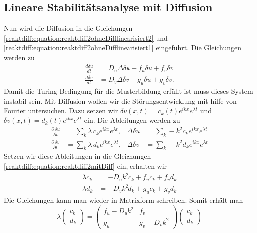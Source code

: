 \subsection{Lineare Stabilitätsanalyse mit Diffusion
\label{reaktdiff:section:matheDiff}}
Nun wird die Diffusion in die Gleichungen \ref{reaktdiff:equation:reaktdiff2ohneDifflinearisiert2} und \ref{reaktdiff:equation:reaktdiff2ohneDifflinearisiert1} eingeführt.
Die Gleichungen werden zu
\begin{align}
    \label{reaktdiff:equation:reaktdiff2mitDiff}
    \frac{d \delta u}{dt} &= D_u \Delta \delta u + 
    f_u \delta u + f_v \delta v\\
    \frac{d \delta v}{dt} &= D_v \Delta \delta v + 
    g_u \delta u + g_v \delta v.
\end{align}
Damit die Turing-Bedingung für die Musterbildung erfüllt ist muss dieses System instabil sein.
Mit Diffusion wollen wir die Störungsentwicklung mit hilfe von Fourier untersuchen.
Dazu setzen wir \(\delta u(x,t) = c_k(t) e^{ikx} e^{\lambda t}\) und \(\delta v(x,t) = d_k(t) e^{ikx} e^{\lambda t}\) ein.
Die Ableitungen werden zu
\begin{align*}
    \frac{\partial\,\delta u}{\partial t} &= \sum_k \lambda\, c_k e^{i k x} e^{\lambda t}, &
    \Delta \delta u &= \sum_k -k^2 c_k e^{i k x} e^{\lambda t} \\
    \frac{\partial\,\delta v}{\partial t} &= \sum_k \lambda\, d_k e^{i k x} e^{\lambda t}, &
    \Delta \delta v &= \sum_k -k^2 d_k e^{i k x} e^{\lambda t}
\end{align*}
Setzen wir diese Ableitungen in die Gleichungen \ref{reaktdiff:equation:reaktdiff2mitDiff} ein, erhalten wir
    \begin{align*}
        \lambda c_k &= -D_u k^2 c_k + f_u c_k + f_v d_k \\
        \lambda d_k &= -D_v k^2 d_k + g_u c_k + g_v d_k
    \end{align*}
Die Gleichungen kann man wieder in Matrixform schreiben.
Somit erhält man
\begin{equation*}
    \lambda
    \begin{pmatrix}
    c_k \\
    d_k
    \end{pmatrix}
    =
    \begin{pmatrix}
        f_u - D_u k^2 & f_v \\
        g_u & g_v - D_v k^2
    \end{pmatrix}
    \begin{pmatrix}
    c_k \\
    d_k
    \end{pmatrix}
\end{equation*}
